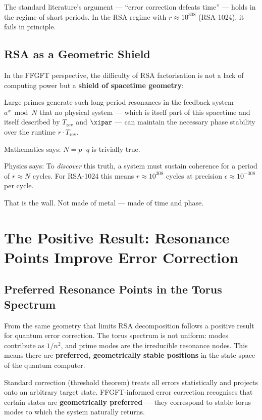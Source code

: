 The standard literature's argument — ``error correction defeats time'' — holds
in the regime of short periods. In the RSA regime with $r \approx 10^{308}$
(RSA-1024), it fails in principle.

\subsection{RSA as a Geometric Shield}

In the FFGFT perspective, the difficulty of RSA factorisation is not a lack of
computing power but a \textbf{shield of spacetime geometry}:

Large primes generate such long-period resonances in the feedback system
$a^x \bmod N$ that no physical system — which is itself part of this spacetime and
itself described by $T_\text{rev}$ and $\xipar$ — can maintain the necessary phase
stability over the runtime $r \cdot T_\text{rev}$.

\begin{conclusionBox}
Mathematics says: $N = p \cdot q$ is trivially true.

Physics says: To \emph{discover} this truth, a system must sustain coherence for a
period of $r \approx N$ cycles. For RSA-1024 this means $r \approx 10^{308}$ cycles
at precision $\epsilon \approx 10^{-308}$ per cycle.

That is the wall. Not made of metal — made of time and phase.
\end{conclusionBox}


\section{The Positive Result: Resonance Points Improve Error Correction}

\subsection{Preferred Resonance Points in the Torus Spectrum}

From the same geometry that limits RSA decomposition follows a positive result for
quantum error correction. The torus spectrum is not uniform: modes contribute as
$1/n^2$, and prime modes are the irreducible resonance nodes. This means there are
\textbf{preferred, geometrically stable positions} in the state space of the quantum
computer.

Standard correction (threshold theorem) treats all errors statistically and projects
onto an arbitrary target state. FFGFT-informed error correction recognises that
certain states are \textbf{geometrically preferred} — they correspond to stable
torus modes to which the system naturally returns.

